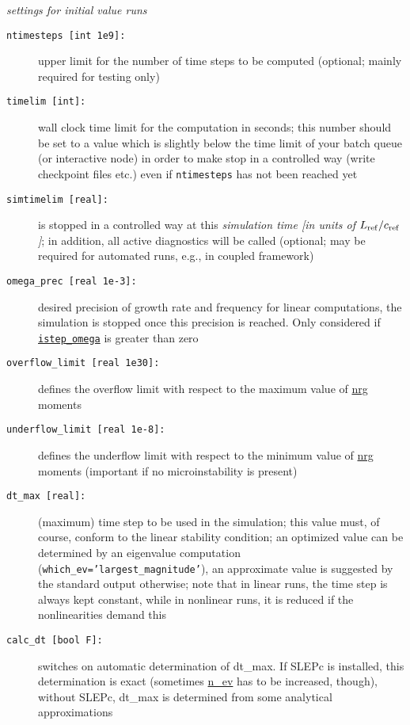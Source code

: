 \documentclass[12pt]{article}
\begin{document}
%
{\em settings for initial value runs}
\begin{description}
\item[\texttt{ntimesteps [int 1e9]:}] upper limit for the number of time steps to be computed (optional; mainly required for testing only)
\item[\hypertarget{timelim}{\texttt{timelim [int]:}}] wall clock time limit for the \gene computation in seconds; this number
  should be set to a value which is slightly below the time limit of your batch queue (or interactive
  node) in order to make \gene stop in a  controlled way (write checkpoint files etc.) even if
  \texttt{ntimesteps} has not been reached yet
\item[\texttt{simtimelim [real]:}] \gene is stopped in a controlled way at this {\em simulation time [in units of
 $L_{\rm ref}/c_{\rm ref}$]}; in addition, all active diagnostics will be called (optional; may be required for automated \gene runs, e.g., in coupled framework)
\item[\hypertarget{omega_prec}{\tt omega\_prec [real 1e-3]:}]
  desired precision of growth rate and frequency for linear computations, the simulation is stopped once
  this precision is reached. Only considered if \hyperlink{istep_omega}{\tt istep\_omega} is greater than zero
\item[{\tt overflow\_limit [real 1e30]:}] defines the overflow limit with respect to the maximum
  value of \hyperref[subsec:nrg-file]{nrg} moments
\item[{\tt underflow\_limit [real 1e-8]:}] defines the underflow limit with respect to the minimum
  value of \hyperref[subsec:nrg-file]{nrg} moments (important if no microinstability is present)
\item[\texttt{dt\_max [real]:}] (maximum) time step to be used in the simulation; this value must,
  of course, conform to the linear stability condition; an optimized value can be determined by an
  eigenvalue computation \\(\texttt{which\_ev='largest\_magnitude'}), an approximate value is suggested by the \gene
  standard output otherwise; note that in linear runs, the time step is always kept constant,
  while in nonlinear runs, it is reduced if the nonlinearities demand this
\item[\texttt{calc\_dt [bool F]:}] switches on automatic determination of dt\_max. If SLEPc is installed,
  this determination is exact (sometimes \hyperlink{n_ev}{n\_ev} has to be increased,
  though), without SLEPc, dt\_max is determined from some analytical approximations

\end{description}
\end{document}
